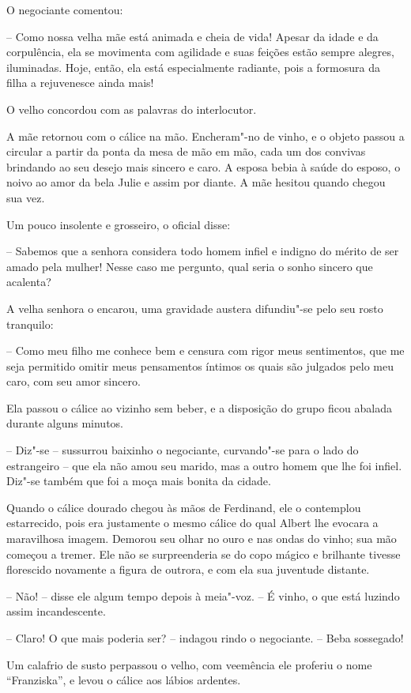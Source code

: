 O negociante comentou:

-- Como nossa velha mãe está animada e cheia de vida! Apesar da
idade e da corpulência, ela se movimenta com agilidade e suas feições
estão sempre alegres, iluminadas. Hoje, então, ela está especialmente
radiante, pois a formosura da filha a rejuvenesce ainda mais!

O velho concordou com as palavras do interlocutor. 

A mãe retornou com o cálice na mão. Encheram"-no de vinho, e o objeto
passou a circular a partir da ponta da mesa de mão em mão, cada um dos
convivas brindando ao seu desejo mais sincero e caro. A esposa bebia à
saúde do esposo, o noivo ao amor da bela Julie e assim por diante. A
mãe hesitou quando chegou sua vez. 

Um pouco insolente e grosseiro, o oficial disse:

-- Sabemos que a senhora considera todo homem infiel e indigno do
mérito de ser amado pela mulher! Nesse caso me pergunto, qual seria o
sonho sincero que acalenta?

A velha senhora o encarou, uma gravidade austera difundiu"-se pelo seu
rosto tranquilo:

-- Como meu filho me conhece bem e censura com rigor meus
sentimentos, que me seja permitido omitir meus pensamentos íntimos os
quais são julgados pelo meu caro, com seu amor sincero.  

 Ela passou o cálice ao vizinho sem beber, e a disposição do grupo ficou
abalada durante alguns minutos. 

 -- Diz"-se -- sussurrou baixinho o negociante, curvando"-se para o lado
do estrangeiro -- que ela não amou seu marido, mas a outro homem que lhe
foi infiel. Diz"-se também que foi a moça mais bonita da cidade. 

Quando o cálice dourado chegou às mãos de Ferdinand, ele o contemplou
estarrecido, pois era justamente o mesmo cálice do qual Albert lhe
evocara a maravilhosa imagem. Demorou seu olhar no ouro e nas ondas do
vinho; sua mão começou a tremer. Ele não se surpreenderia se do copo
mágico e brilhante tivesse florescido novamente a figura de outrora, e
com ela sua juventude distante. 

-- Não! -- disse ele algum tempo depois à meia"-voz. -- É vinho, o que
está luzindo assim incandescente. 

-- Claro! O que mais poderia ser? -- indagou rindo o negociante. -- Beba sossegado!

Um calafrio de susto perpassou o velho, com veemência ele proferiu o
nome ``Franziska'', e levou o cálice aos lábios ardentes.

